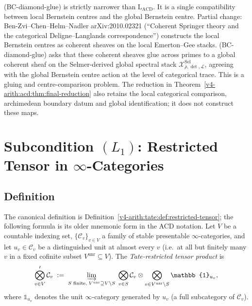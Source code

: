 \begin{remark}
\label{v4-arith:acd:rem:bc-diamond-glue-domain}
(BC-diamond-glue) is strictly narrower than \(\mathrm{L}_{\mathrm{ACD}}\).
It is a single compatibility between local Bernstein centres and the
global Bernstein centre. Partial change:
Ben-Zvi--Chen--Helm--Nadler arXiv:2010.02321 (``Coherent Springer
theory and the categorical Deligne--Langlands correspondence'')
constructs the local Bernstein centres as coherent sheaves on the
local Emerton--Gee stacks. (BC-diamond-glue) asks that these coherent
sheaves glue across primes to a global coherent sheaf on the
Selmer-derived global spectral stack
\(\mathcal{X}^{\mathrm{Sel}}_{\bar\rho,\det,\mathcal{L}}\), agreeing
with the global Bernstein centre action at the level of categorical
trace.
This is a gluing and centre-comparison problem. The reduction in
Theorem~\ref{v4-arith:acd:thm:final-reduction} also retains the local
categorical comparison, archimedean boundary datum and global
identification; it does not construct these maps.
\end{remark}

\section{Subcondition \((L_{1})\): Restricted Tensor in \(\infty\)-Categories}
\label{v4-arith:acd:L1}

\subsection{Definition}

\begin{definition}
\label{v4-arith:acd:def:restricted-tensor}
The canonical definition is Definition~\ref{v4-arith:tate:def:restricted-tensor};
the following formula is its older mnemonic form in the ACD notation.
Let \(V\) be a countable indexing set, \(\{\mathcal{C}_{v}\}_{v\in V}\)
a family of stable presentable \(\infty\)-categories, and let
\(u_{v}\in\mathcal{C}_{v}\) be a distinguished unit at almost every
\(v\) (i.e.\ at all but finitely many \(v\) in a fixed cofinite subset
\(V^{\mathrm{unr}}\subseteq V\)). The \emph{Tate-restricted tensor
product} is
\begin{equation}
\bigotimes_{v\in V}^{\prime}\mathcal{C}_{v}\;:=\;\varinjlim_{S\text{ finite},\; V^{\mathrm{unr}}\supseteq V\setminus S}\;\bigotimes_{v\in S}\mathcal{C}_{v}\otimes\bigotimes_{v\in V^{\mathrm{unr}}\setminus S}\mathbb{1}_{u_{v}},
\end{equation}
where \(\mathbb{1}_{u_{v}}\) denotes the unit \(\infty\)-category
generated by \(u_{v}\) (a full subcategory of \(\mathcal{C}_{v}\)).
\end{definition}

